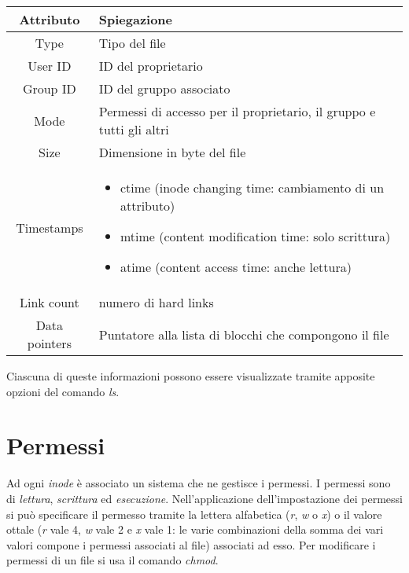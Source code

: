 \begin{center}
	\begin{tabular}{|c|p{10cm}|}
		\hline
		\textbf{Attributo} & \textbf{Spiegazione} \\ \hline
		Type & Tipo del file \\ \hline
		User ID & ID del proprietario \\ \hline
		Group ID & ID del gruppo associato \\ \hline
		Mode & Permessi di accesso per il proprietario, il gruppo e tutti gli altri \\ \hline
		Size & Dimensione in byte del file \\ \hline
		Timestamps & \begin{itemize}
			\item ctime (inode changing time: cambiamento di un attributo)
			\item mtime (content modification time: solo scrittura)
			\item atime (content access time: anche lettura)
		\end{itemize} \\ \hline
		Link count & numero di hard links \\ \hline
		Data pointers & Puntatore alla lista di blocchi che compongono il file \\ \hline	
	\end{tabular}
\end{center}

Ciascuna di queste informazioni possono essere visualizzate tramite apposite opzioni del comando \textit{ls}.

\section{Permessi}
Ad ogni \textit{inode} è associato un sistema che ne gestisce i permessi. I permessi sono di \textit{lettura}, \textit{scrittura} ed \textit{esecuzione}. Nell'applicazione dell'impostazione dei permessi si può specificare il permesso tramite la lettera alfabetica (\textit{r}, \textit{w} o \textit{x}) o il valore ottale (\textit{r} vale 4, \textit{w} vale 2 e \textit{x} vale 1: le varie combinazioni della somma dei vari valori compone i permessi associati al file) associati ad esso.
Per modificare i permessi di un file si usa il comando \textit{chmod}.


